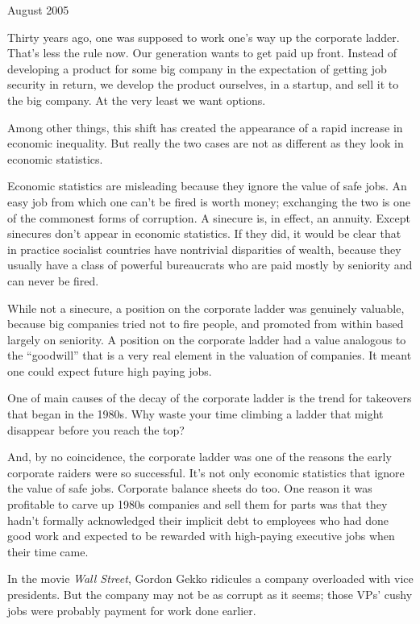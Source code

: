 August 2005

Thirty years ago, one was supposed to work one's way up the corporate
ladder. That's less the rule now. Our generation wants to get paid up
front. Instead of developing a product for some big company in the
expectation of getting job security in return, we develop the product
ourselves, in a startup, and sell it to the big company. At the very
least we want options.

Among other things, this shift has created the appearance of a rapid
increase in economic inequality. But really the two cases are not as
different as they look in economic statistics.

Economic statistics are misleading because they ignore the value of safe
jobs. An easy job from which one can't be fired is worth money;
exchanging the two is one of the commonest forms of corruption. A
sinecure is, in effect, an annuity. Except sinecures don't appear in
economic statistics. If they did, it would be clear that in practice
socialist countries have nontrivial disparities of wealth, because they
usually have a class of powerful bureaucrats who are paid mostly by
seniority and can never be fired.

While not a sinecure, a position on the corporate ladder was genuinely
valuable, because big companies tried not to fire people, and promoted
from within based largely on seniority. A position on the corporate
ladder had a value analogous to the ``goodwill'' that is a very real
element in the valuation of companies. It meant one could expect future
high paying jobs.

One of main causes of the decay of the corporate ladder is the trend for
takeovers that began in the 1980s. Why waste your time climbing a ladder
that might disappear before you reach the top?

And, by no coincidence, the corporate ladder was one of the reasons the
early corporate raiders were so successful. It's not only economic
statistics that ignore the value of safe jobs. Corporate balance sheets
do too. One reason it was profitable to carve up 1980s companies and
sell them for parts was that they hadn't formally acknowledged their
implicit debt to employees who had done good work and expected to be
rewarded with high-paying executive jobs when their time came.

In the movie \emph{Wall Street}, Gordon Gekko ridicules a company
overloaded with vice presidents. But the company may not be as corrupt
as it seems; those VPs' cushy jobs were probably payment for work done
earlier.

